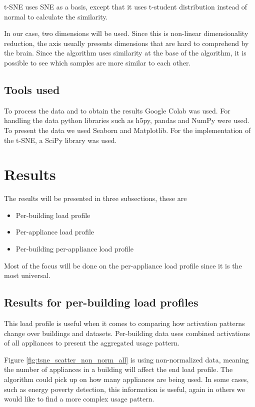 t-SNE uses SNE as a basis, except that it uses t-student distribution instead of normal to calculate the similarity.

In our case, two dimensions will be used. Since this is non-linear dimensionality reduction,
the axis usually presents dimensions that are hard to comprehend by the brain. 
Since the algorithm uses similarity at the base of the algorithm, it is possible to 
see which samples are more similar to each other.

\subsection{Tools used}

To process the data and to obtain the results Google Colab was used.
For handling the data python libraries such as h5py, pandas and NumPy were used.
To present the data we used Seaborn and Matplotlib.
For the implementation of the t-SNE, a SciPy library was used.

\section{Results}

The results will be presented in three subsections, these are

\begin{itemize}
	\item Per-building load profile
	\item Per-appliance load profile
	\item Per-building per-appliance load profile
\end{itemize}

Most of the focus will be done on the per-appliance load profile since it is the most universal.

\subsection{Results for per-building load profiles}
\label{ssec:res_pb_lp}
This load profile is useful when it comes to comparing how 
activation patterns change over buildings and datasets.
Per-building data uses combined activations of all appliances to present 
the aggregated usage pattern. 

Figure \ref{fig:tsne_scatter_non_norm_all} is using non-normalized data, meaning
the number of appliances in a building will affect the end load profile.
The algorithm could pick up on how many appliances are being used.
In some cases, such as energy poverty detection, this information is useful, 
again in others we would like to find a more complex usage pattern.

